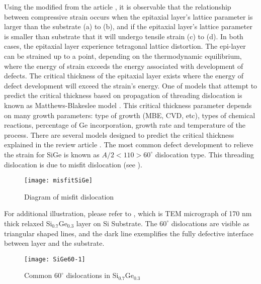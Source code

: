 Using the modified  from the article \cite{Paul1}, it is observable that  the relationship between compressive strain occurs when the epitaxial layer's lattice parameter is larger than the substrate (a) to (b), and if the epitaxial layer's lattice parameter is smaller than substrate that it will undergo tensile strain (c) to (d).  In both cases, the epitaxial layer experience tetragonal lattice distortion.  The epi-layer can be strained up to a point, depending on the thermodynamic equilibrium, where the energy of strain exceeds the energy associated with development of defects.  The critical thickness of the epitaxial layer exists where the energy of defect development will exceed the strain's energy.  One of models that attempt to predict the critical thickness based on propagation of threading dislocation is known as Matthews-Blakeslee model \cite{Matthews1,Matthews2,Matthews3}.  This critical thickness parameter depends on many growth parameters:  type of growth (MBE, CVD, etc), types of chemical reactions, percentage of Ge incorporation, growth rate and temperature of the process.  There are several models designed to predict the critical thickness explained in the review article \cite{Paul1}.  The most common defect development to relieve the strain for SiGe is known as \emph{$A/2<110> 60^{\circ}$} dislocation type.  This threading dislocation is due to misfit dislocation (see ).  
\begin{figure}[h]
\caption{Diagram of misfit dislocation \cite{Fig2-4}}
\label{misfitSiGe}
\begin{minipage}{\linewidth} 
\centering
\texttt{[image: misfitSiGe]}
\end{minipage}
\end{figure}

For additional illustration, please refer to , which is TEM micrograph of 170 nm thick relaxed Si$_{0.7}$Ge$_{0.3}$ layer on Si Substrate. The $60^{\circ}$ dislocations are visible as triangular shaped lines, and the dark line exemplifies the fully defective interface between layer and the substrate.  

\begin{figure}[h]
\caption{Common $60^{\circ}$ dislocations in Si$_{0.7}$Ge$_{0.3}$ }
\label{SiGe60-1}
\begin{minipage}{\linewidth} 
\centering
\texttt{[image: SiGe60-1]}
\end{minipage}
\end{figure}

